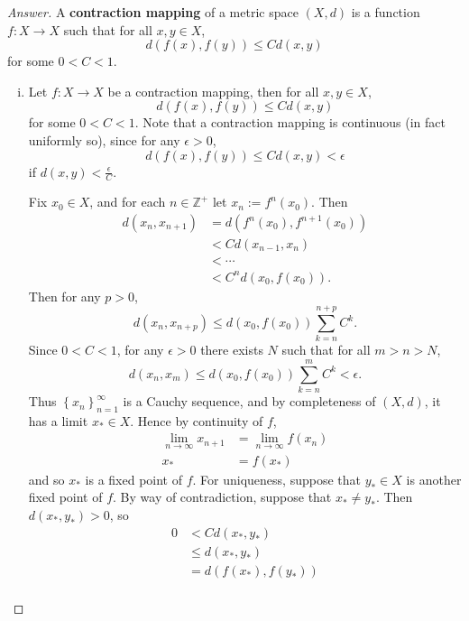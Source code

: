 \documentclass[12pt]{article}
\newcommand{\z}{\mathbb{Z}}
\newcommand\paren[1]{\left( #1 \right)}
\newcommand\setb[1]{\left \{ #1 \right \}}
\theoremstyle{definition}
\begin{document}
\begin{proof}[Answer]
    A \textbf{contraction mapping} of a metric space $(X,d)$ is a function $f : X \to X$ such that for all $x, y \in X$,
    \[
        d \paren{ f(x) , f(y) } \leq C d(x,y)
    \]
    for some $0 < C < 1$. 
    \begin{enumerate}[(i)]
        \item Let $f : X \to X$ be a contraction mapping, then for all $x, y \in X$,
        \[
            d \paren{ f(x) , f(y) } \leq C d(x,y)
        \]
        for some $0 < C < 1$. Note that a contraction mapping is continuous (in fact uniformly so), since for any $\epsilon > 0 $,
        \[
            d \paren{ f(x) , f(y) } \leq C d(x,y) < \epsilon
        \]
        if $d(x,y) < \frac{\epsilon}{C}$.
        
        Fix $x_0 \in X$, and for each $n \in \z^+$ let $x_n := f^{n}(x_0)$. Then 
        \begin{align*}
            d \paren{x_n,x_{n+1}} & = d \paren{ f^n(x_0) , f^{n+1}(x_0) } \\
            & < C d \paren{ x_{n-1} , x_n } \\
            & < \cdots \\
            & < C^n d \paren{ x_0 , f(x_0) }.
        \end{align*}
        Then for any $p > 0$, 
        \[
            d \paren{ x_n , x_{n+p} } \leq d(x_0,f(x_0)) \sum\limits_{k = n}^{n+p} C^k.
        \]
        Since $0 < C < 1$, for any $\epsilon > 0$ there exists $N$ such that for all $m > n > N$, 
        \[
            d \paren{ x_n , x_m } \leq d(x_0,f(x_0)) \sum\limits_{k = n}^{m} C^k < \epsilon.
        \]
        Thus $\setb{ x_n }_{n=1}^{\infty}$ is a Cauchy sequence, and by completeness of $(X,d)$, it has a limit $x_* \in X$. Hence by continuity of $f$, 
        \begin{align*}
            \lim\limits_{n\to\infty} x_{n+1} & = \lim\limits_{n \to \infty} f(x_n) \\
            x_* & = f(x_*)
        \end{align*}
        and so $x_*$ is a fixed point of $f$. For uniqueness, suppose that $y_* \in X$ is another fixed point of $f$. By way of contradiction, suppose that $x_* \neq y_*$. Then $d(x_*,y_*) > 0$, so
        \begin{align*}
            0 & < C d(x_*,y_*) \\
            & \leq d(x_*,y_*) \\
            & = d \paren{ f(x_*) , f(y_*) } \\

\end{align*}
\end{enumerate}
\end{proof}
\end{document}
